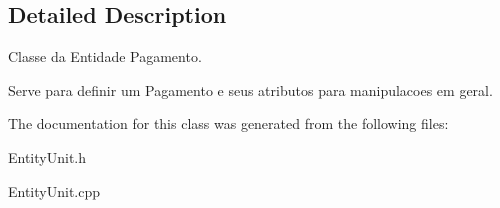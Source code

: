 \subsection{Detailed Description}
Classe da Entidade Pagamento. 

Serve para definir um Pagamento e seus atributos para manipulacoes em geral. 

The documentation for this class was generated from the following files\-:\begin{DoxyCompactItemize}
\item 
Entity\-Unit.\-h\item 
Entity\-Unit.\-cpp\end{DoxyCompactItemize}

